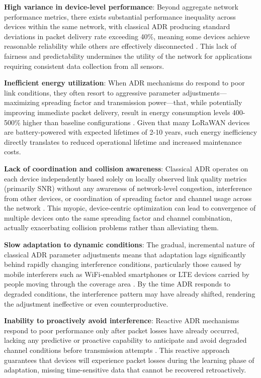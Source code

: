 \documentclass[12pt,a4paper]{article}
\begin{document}
\textbf{High variance in device-level performance}: Beyond aggregate network performance metrics, there exists substantial performance inequality across devices within the same network, with classical ADR producing standard deviations in packet delivery rate exceeding 40\%, meaning some devices achieve reasonable reliability while others are effectively disconnected \cite{slabicki2018adaptive}. This lack of fairness and predictability undermines the utility of the network for applications requiring consistent data collection from all sensors.

\textbf{Inefficient energy utilization}: When ADR mechanisms do respond to poor link conditions, they often resort to aggressive parameter adjustments—maximizing spreading factor and transmission power—that, while potentially improving immediate packet delivery, result in energy consumption levels 400-500\% higher than baseline configurations \cite{reynders2017power}. Given that many LoRaWAN devices are battery-powered with expected lifetimes of 2-10 years, such energy inefficiency directly translates to reduced operational lifetime and increased maintenance costs.

\textbf{Lack of coordination and collision awareness}: Classical ADR operates on each device independently based solely on locally observed link quality metrics (primarily SNR) without any awareness of network-level congestion, interference from other devices, or coordination of spreading factor and channel usage across the network \cite{cuomo2017explora}. This myopic, device-centric optimization can lead to convergence of multiple devices onto the same spreading factor and channel combination, actually exacerbating collision problems rather than alleviating them.

\textbf{Slow adaptation to dynamic conditions}: The gradual, incremental nature of classical ADR parameter adjustments means that adaptation lags significantly behind rapidly changing interference conditions, particularly those caused by mobile interferers such as WiFi-enabled smartphones or LTE devices carried by people moving through the coverage area \cite{mikhaylov2016analysis}. By the time ADR responds to degraded conditions, the interference pattern may have already shifted, rendering the adjustment ineffective or even counterproductive.

\textbf{Inability to proactively avoid interference}: Reactive ADR mechanisms respond to poor performance only after packet losses have already occurred, lacking any predictive or proactive capability to anticipate and avoid degraded channel conditions before transmission attempts \cite{abdelfadeel2020machine}. This reactive approach guarantees that devices will experience packet losses during the learning phase of adaptation, missing time-sensitive data that cannot be recovered retroactively.
\end{document}
